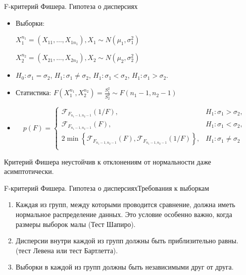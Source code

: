 \documentclass[11pt,pdf,utf8,hyperref={unicode},aspectratio=169]{beamer}
\begin{document}
\begin{frame}[label=ftest]{\hyperlink{onesample}{} F-критерий Фишера. Гипотеза о дисперсиях}
    \begin{itemize}
        \item Выборки:

            $X_1^{n_1}=\left(X_{11},\ldots,X_{1n_1}\right), X_{1} \sim N\left(\mu_1, \sigma_1^2\right)$

            $X_2^{n_2}=\left(X_{21},\ldots,X_{2n_2}\right), X_{2} \sim N\left(\mu_2, \sigma_2^2\right)$

        \item $H_0\colon \sigma_1=\sigma_2$,\qquad
            $H_1\colon \sigma_1 \neq \sigma_2$,
            $H_1\colon \sigma_1 < \sigma_2$,
            $H_1\colon \sigma_1 > \sigma_2$.
        \item Статистика:
            \alert{$
                F\left(X_1^{n_1}, X_2^{n_2}\right) = \frac{S_1^2}{S_2^2} \sim F(n_1-1, n_2-1)
            $}
        \item {}
            $$
                p\left(F\right) = \begin{cases}
                    \mathcal{F}_{F_{n_1-1,n_2-1}}(1/F), &
                                H_1 \colon \sigma_1>\sigma_2, \\
                    \mathcal{F}_{F_{n_1-1,n_2-1}}(F), &  H_1 \colon \sigma_1 < \sigma_2, \\
                    2\min\left\{\mathcal{F}_{F_{n_1-1,n_2-1}}(F), \mathcal{F}_{F_{n_1-1,n_2-1}}(1/F)\right\}, & H_1 \colon \sigma_1 \neq \sigma_2 \\
                \end{cases}
            $$
    \end{itemize}
    Критерий Фишера неустойчив к отклонениям от нормальности даже асимптотически.
\end{frame}


\begin{frame}{\hyperlink{onesample}{} F-критерий Фишера. Гипотеза о дисперсиях}{Требования к выборкам}
    \begin{enumerate}
        \item {} Каждая из групп, между которыми проводится сравнение, должна иметь нормальное распределение данных. Это условие особенно важно, когда размеры выборок малы (Тест Шапиро).
        \item {} Дисперсии внутри каждой из групп должны быть приблизительно равны.  (тест Левена или тест Бартлетта).

        \item {} Выборки в каждой из групп должны быть независимыми друг от друга.

    \end{enumerate}

\end{frame}
\end{document}
